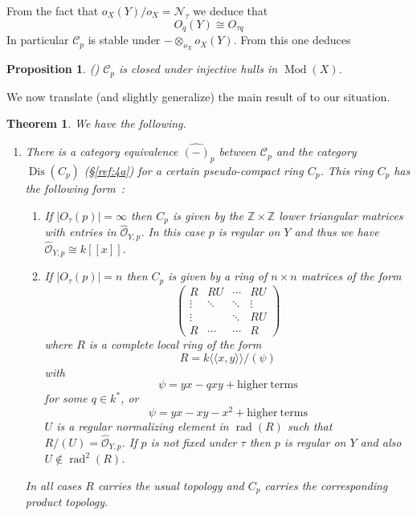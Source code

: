 \documentclass{amsproc}
\def \ZZ{{\mathbb Z}}
\def\Cscr{{\mathcal C}}
\def\Nscr{{\mathcal N}}
\def\Oscr{{\mathcal O}}
\DeclareMathOperator{\Dis}{Dis}
\def\rad{\operatorname {rad}}
\def\Qch{\operatorname {Mod}}
\newtheorem{propositions}[lemmas]{Proposition}
\newtheorem{theorems}[lemmas]{Theorem}
\theoremstyle{definition}
\theoremstyle{remark}
\numberwithin{equation}{section}
\numberwithin{table}{section}
\numberwithin{figure}{section}
\begin{document}
 From the fact that $o_X(Y)/o_X=\Nscr_\tau$ we deduce that 
 \begin{equation}
 \label{ref:5.5a}
 O_q(Y)\cong O_{\tau q}
 \end{equation}
 In particular $\Cscr_p$ is stable under $-\otimes_{o_X}o_X(Y)$. From
 this one deduces
 \begin{propositions} (\cite[Prop.\ 8.4]{VdBVG})
 \label{ref:5.1.3a}
 $\Cscr_p$ is closed under injective hulls in $\Qch(X)$.
 \end{propositions}
 We now translate (and slightly generalize) the main result of
 \cite{VdBVG} to our situation.
 \begin{theorems}
\label{ref:5.1.4a}
We have the following.
\begin{enumerate}
\item There is a category equivalence $\hat{(-)}_{p}$ between
  $\Cscr_{p}$ and the category $\Dis(C_p)$ (\S\ref{ref:4a}) for a
  certain pseudo-compact ring $C_p$. This ring $C_p$ has the following
  form~:
\begin{enumerate}
\item
If $|O_\tau(p)|=\infty$ then $C_p$ is given by the $\ZZ\times\ZZ$ lower
triangular matrices with entries in $\hat{\Oscr}_{Y,p}$. In this case $p$
is regular on $Y$ and thus
we  have $\hat{\Oscr}_{Y,p}\cong k[[x]]$.
\item If $|O_\tau(p)|=n$ then $C_p$ is given by a ring of $n\times n$
matrices of the form
\[
\begin{pmatrix}
R& RU &\cdots &RU\\
\vdots &\ddots& \ddots&\vdots\\
\vdots &&\ddots &RU\\
R&\cdots&\cdots&R
\end{pmatrix}
\]
where $R$ is a complete local ring of the form
\[
R=k\langle\langle x,y\rangle\rangle/(\psi)
\]
with
\begin{equation}
\label{ref:5.6a}
\psi=yx-qxy+\mathrm{higher\ terms}
\end{equation}
for some $q\in k^\ast$, or
\begin{equation}
\label{ref:5.7a}
\psi=yx-xy-x^2+\mathrm{higher\ terms}
\end{equation}
$U$ is a regular normalizing element in $\rad(R)$ such that
$R/(U)=\hat{\Oscr}_{Y,p}$. If $p$ is not  fixed under $\tau$ then 
$p$ is regular on $Y$
and also $U\not\in\rad^2(R)$.
\end{enumerate}
In all cases $R$ carries the usual topology and $C_p$ carries the
corresponding product topology.

\end{enumerate}
\end{theorems}
\end{document}
